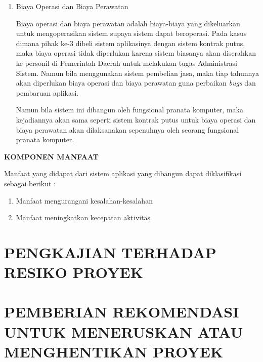 \documentclass[pdftex, 12pt, oneside]{article}
\begin{document}
\begin{enumerate}[1.]
  \item Biaya Operasi dan Biaya Perawatan
  
  Biaya operasi dan biaya perawatan adalah biaya-biaya yang dikeluarkan untuk mengoperasikan sistem supaya sistem dapat beroperasi. Pada kasus dimana pihak ke-3 dibeli sistem aplikasinya dengan sistem kontrak putus, maka biaya operasi tidak diperlukan karena sistem biasanya akan diserahkan ke personil di Pemerintah Daerah untuk melakukan tugas Administrasi Sistem. Namun bila menggunakan sistem pembelian jasa, maka tiap tahunnya akan diperlukan biaya operasi dan biaya perawatan guna perbaikan \textit{bugs} dan pembaruan aplikasi.
  
  Namun bila sistem ini dibangun oleh fungsional pranata komputer, maka kejadiannya akan sama seperti sistem kontrak putus untuk biaya operasi dan biaya perawatan akan dilaksanakan sepenuhnya oleh seorang fungsional pranata komputer.
  
\end{enumerate}

\textbf{KOMPONEN MANFAAT}

Manfaat yang didapat dari sistem aplikasi yang dibangun dapat diklasifikasi sebagai berikut :

\begin{enumerate}[1.]
  \item Manfaat mengurangani kesalahan-kesalahan
  \item Manfaat meningkatkan kecepatan aktivitas
\end{enumerate}

\section{PENGKAJIAN TERHADAP RESIKO PROYEK}


\section{PEMBERIAN REKOMENDASI UNTUK MENERUSKAN ATAU MENGHENTIKAN PROYEK}
\end{document}
